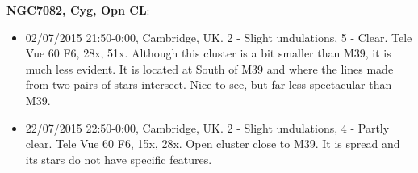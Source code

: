 {\bf NGC7082, Cyg, Opn CL}:
\begin{itemize}
\item 02/07/2015 21:50-0:00, Cambridge, UK. 2 - Slight undulations, 5 - Clear. Tele Vue 60 F6, 28x, 51x. Although this cluster is a bit smaller than M39, it is much less evident. It is located at South of M39 and where the lines made from two pairs of stars intersect. Nice to see, but far less spectacular than M39.
\item 22/07/2015 22:50-0:00, Cambridge, UK. 2 - Slight undulations, 4 - Partly clear. Tele Vue 60 F6, 15x, 28x. Open cluster close to M39. It is spread and its stars do not have specific features.
\end{itemize}
